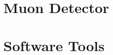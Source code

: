 \documentclass[10pt,final]{report}
\begin{document}
\chapter{Muon Detector}

\chapter{Software Tools}







\printbibliography
\end{document}
